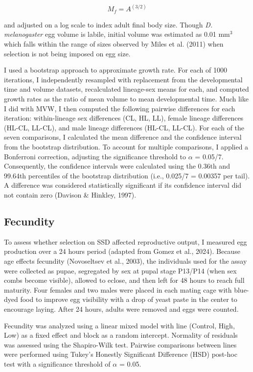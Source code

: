 \documentclass[12pt,reqno,oneside]{report}
\begin{document}
\[M_f = A^{(3/2)}\]

\noindent and adjusted on a log scale to index adult final body size. Though \textit{D. melanogaster} egg volume is labile, initial volume was estimated as 0.01 mm\(^3\) which falls within the range of sizes observed by Miles et al. (2011) when selection is not being imposed on egg size. 

I used a bootstrap approach to approximate growth rate. For each of 1000 iterations, I independently resampled with replacement from the developmental time and volume datasets, recalculated lineage-sex means for each, and computed growth rates as the ratio of mean volume to mean developmental time. Much like I did with MVW, I then computed the following pairwise differences for each iteration: within-lineage sex differences (CL, HL, LL), female lineage differences (HL-CL, LL-CL), and male lineage differences (HL-CL, LL-CL). For each of the seven comparisons, I calculated the mean difference and the confidence interval from the bootstrap distribution. To account for multiple comparisons, I applied a Bonferroni correction, adjusting the significance threshold to \(\alpha\) = 0.05/7. Consequently, the confidence intervals were calculated using the 0.36th and 99.64th percentiles of the bootstrap distribution (i.e., 0.025/7 = 0.00357 per tail). A difference was considered statistically significant if its confidence interval did not contain zero (Davison \& Hinkley, 1997).

\subsection{Fecundity}

To assess whether selection on SSD affected reproductive output, I measured egg production over a 24 hours period (adapted from Gomez et al., 2024). Because age effects fecundity (Novoseltsev et al., 2003), the individuals used for the assay were collected as pupae, segregated by sex at pupal stage P13/P14 (when sex combs become visible), allowed to eclose, and then left for 48 hours to reach full maturity. Four females and two males were placed in each mating cage with blue-dyed food to improve egg visibility with a drop of yeast paste in the center to encourage laying. After 24 hours, adults were removed and eggs were counted.

Fecundity was analyzed using a linear mixed model with line (Control, High, Low) as a fixed effect and block as a random intercept. Normality of residuals was assessed using the Shapiro-Wilk test. Pairwise comparisons between lines were performed using Tukey's Honestly Significant Difference (HSD) post-hoc test with a significance threshold of \(\alpha\) = 0.05.
\end{document}
